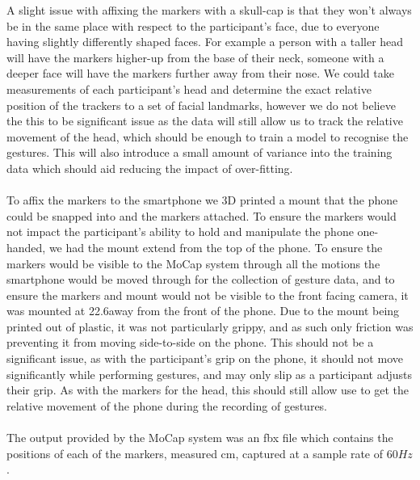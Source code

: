A slight issue with affixing the markers with a skull-cap is that they won't always be in the same place with respect to the participant's face, due to everyone having slightly differently shaped faces. For example a person with a taller head will have the markers higher-up from the base of their neck, someone with a deeper face will have the markers further away from their nose.
We could take measurements of each participant's head and determine the exact relative position of the trackers to a set of facial landmarks, however we do not believe the this to be significant issue as the data will still allow us to track the relative movement of the head, which should be enough to train a model to recognise the gestures. This will also introduce a small amount of variance into the training data which should aid reducing the impact of over-fitting.
\\\\
To affix the markers to the smartphone we 3D printed a mount that the phone could be snapped into and the markers attached.
To ensure the markers would not impact the participant's ability to hold and manipulate the phone one-handed, we had the mount extend from the top of the phone. To ensure the markers would be visible to the MoCap system through all the motions the smartphone would be moved through for the collection of gesture data, and to ensure the markers and mount would not be visible to the front facing camera, it was mounted at 22.6\textdegree away from the front of the phone.
Due to the mount being printed out of plastic, it was not particularly grippy, and as such only friction was preventing it from moving side-to-side on the phone. This should not be a significant issue, as with the participant's grip on the phone, it should not move significantly while performing gestures, and may only slip as a participant adjusts their grip. As with the markers for the head, this should still allow use to get the relative movement of the phone during the recording of gestures.
\nl{}
\\\\
The output provided by the MoCap system was an fbx file which contains the positions of each of the markers, measured cm, captured at a sample rate of $60Hz$. 

